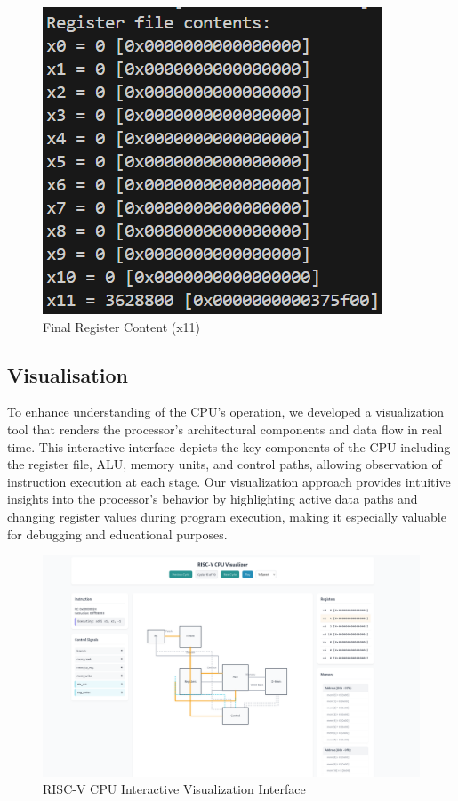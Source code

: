 \documentclass{article}
\numberwithin{figure}{section}
\numberwithin{table}{section}
\begin{document}
\begin{figure}[H]
    \centering
    \includegraphics[width=0.6\linewidth]{seq_fac_out.png}
    \caption{Final Register Content (x11)}
    \label{fig:factorial-output}
\end{figure}
\subsection{Visualisation}
To enhance understanding of the CPU's operation, we developed a visualization tool that renders the processor's architectural components and data flow in real time. This interactive interface depicts the key components of the CPU including the register file, ALU, memory units, and control paths, allowing observation of instruction execution at each stage. Our visualization approach provides intuitive insights into the processor's behavior by highlighting active data paths and changing register values during program execution, making it especially valuable for debugging and educational purposes.

\begin{figure}[H]
    \centering
    \includegraphics[width=0.95\linewidth]{visualization.png}
    \caption{RISC-V CPU Interactive Visualization Interface}
    \label{fig:cpu-visualizer}
\end{figure}
\end{document}
